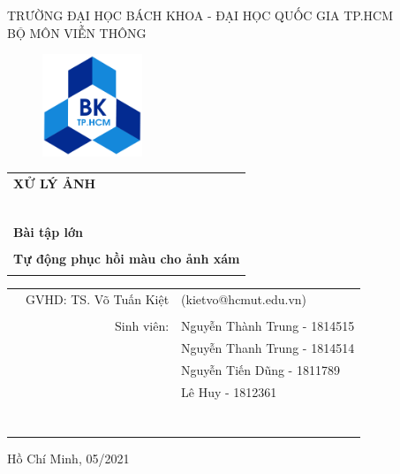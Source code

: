 \documentclass[a4paper]{article}
\begin{document}
\begin{titlepage}

\begin{center}
TRƯỜNG ĐẠI HỌC BÁCH KHOA - ĐẠI HỌC QUỐC GIA TP.HCM\\
BỘ MÔN VIỄN THÔNG
\end{center}

\vspace{1cm}

\begin{figure}[h!]
\begin{center}
\includegraphics[width=3cm]{hcmut.png}
\end{center}
\end{figure}

\vspace{1cm}


\begin{center}
\begin{tabular}{c}
\multicolumn{1}{l}{\textbf{{\Large XỬ LÝ ẢNH}}}\\
~~\\
\hline
\\
\multicolumn{1}{l}{\textbf{{\Large Bài tập lớn}}}\\
\\
\textbf{\Huge Tự động phục hồi màu cho ảnh xám}\\
\\
\hline
\end{tabular}
\end{center}

\vspace{3cm}

\begin{table}[h]
\begin{tabular}{rrl}

\hspace{2.7 cm} & GVHD: TS. Võ Tuấn Kiệt & (kietvo@hcmut.edu.vn)\\\\
& Sinh viên: & Nguyễn Thành Trung - 1814515\\ && Nguyễn Thanh Trung - 1814514\\ && Nguyễn Tiến Dũng - 1811789\\ && Lê Huy - 1812361
\\\\\\\\\\\\\\\\

\end{tabular}
\end{table}

\begin{center}
{\footnotesize Hồ Chí Minh, 05/2021}
\end{center}
\end{titlepage}
\end{document}

